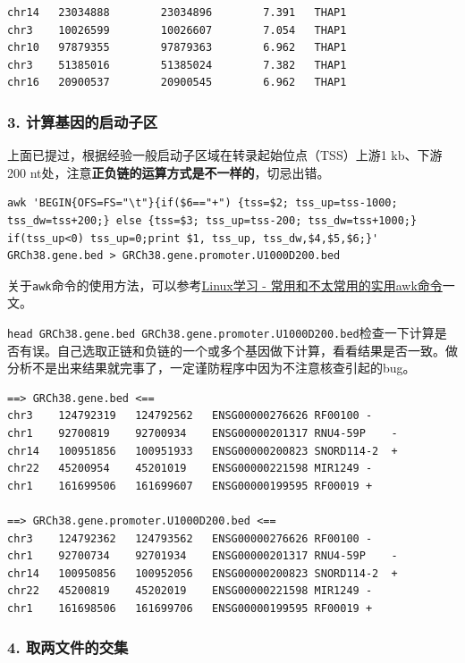 \documentclass[]{article}
\numberwithin{figure}{section}
\numberwithin{table}{section}
\begin{document}
\begin{verbatim}
chr14   23034888        23034896        7.391   THAP1
chr3    10026599        10026607        7.054   THAP1
chr10   97879355        97879363        6.962   THAP1
chr3    51385016        51385024        7.382   THAP1
chr16   20900537        20900545        6.962   THAP1
\end{verbatim}

\hypertarget{biomart_motif_7}{%
\subsubsection{3. 计算基因的启动子区}\label{biomart_motif_7}}

上面已提过，根据经验一般启动子区域在转录起始位点（TSS）上游1 kb、下游 200 nt处，注意\textbf{正负链的运算方式是不一样的}，切忌出错。

\begin{verbatim}
awk 'BEGIN{OFS=FS="\t"}{if($6=="+") {tss=$2; tss_up=tss-1000; tss_dw=tss+200;} else {tss=$3; tss_up=tss-200; tss_dw=tss+1000;} if(tss_up<0) tss_up=0;print $1, tss_up, tss_dw,$4,$5,$6;}' GRCh38.gene.bed > GRCh38.gene.promoter.U1000D200.bed
\end{verbatim}

关于\texttt{awk}命令的使用方法，可以参考\href{https://mp.weixin.qq.com/s/8wD14FXt7fLDo1BjJyT0ew}{Linux学习 - 常用和不太常用的实用awk命令}一文。

\texttt{head\ GRCh38.gene.bed\ GRCh38.gene.promoter.U1000D200.bed}检查一下计算是否有误。自己选取正链和负链的一个或多个基因做下计算，看看结果是否一致。做分析不是出来结果就完事了，一定谨防程序中因为不注意核查引起的bug。

\begin{verbatim}
==> GRCh38.gene.bed <==
chr3	124792319	124792562	ENSG00000276626	RF00100	-
chr1	92700819	92700934	ENSG00000201317	RNU4-59P	-
chr14	100951856	100951933	ENSG00000200823	SNORD114-2	+
chr22	45200954	45201019	ENSG00000221598	MIR1249	-
chr1	161699506	161699607	ENSG00000199595	RF00019	+

==> GRCh38.gene.promoter.U1000D200.bed <==
chr3	124792362	124793562	ENSG00000276626	RF00100	-
chr1	92700734	92701934	ENSG00000201317	RNU4-59P	-
chr14	100950856	100952056	ENSG00000200823	SNORD114-2	+
chr22	45200819	45202019	ENSG00000221598	MIR1249	-
chr1	161698506	161699706	ENSG00000199595	RF00019	+
\end{verbatim}

\hypertarget{biomart_motif_8}{%
\subsubsection{4. 取两文件的交集}\label{biomart_motif_8}}
\end{document}
